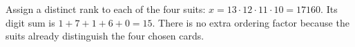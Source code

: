 Assign a distinct rank to each of the four suits: $ x=13\cdot12\cdot11\cdot10=17160 $. Its digit sum is $ 1+7+1+6+0=\boxed{15}$. There is no extra ordering factor because the suits already distinguish the four chosen cards.
